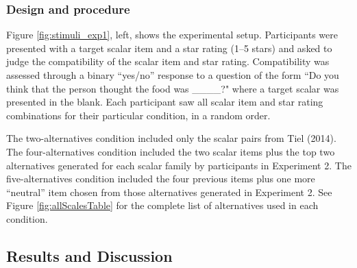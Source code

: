 \documentclass[10pt, letterpaper]{article}
\begin{document}
\subsubsection{Design and procedure}\label{design-and-procedure}

Figure \ref{fig:stimuli_exp1}, left, shows the experimental setup.
Participants were presented with a target scalar item and a star rating
(1--5 stars) and asked to judge the compatibility of the scalar item and
star rating. Compatibility was assessed through a binary ``yes/no''
response to a question of the form ``Do you think that the person
thought the food was \_\_\_\_?" where a target scalar was presented in
the blank. Each participant saw all scalar item and star rating
combinations for their particular condition, in a random order.

The two-alternatives condition included only the scalar pairs from Tiel
(2014). The four-alternatives condition included the two scalar items
plus the top two alternatives generated for each scalar family by
participants in Experiment 2. The five-alternatives condition included
the four previous items plus one more ``neutral'' item chosen from those
alternatives generated in Experiment 2. See Figure
\ref{fig:allScalesTable} for the complete list of alternatives used in
each condition.

\subsection{Results and Discussion}\label{results-and-discussion}
\end{document}
